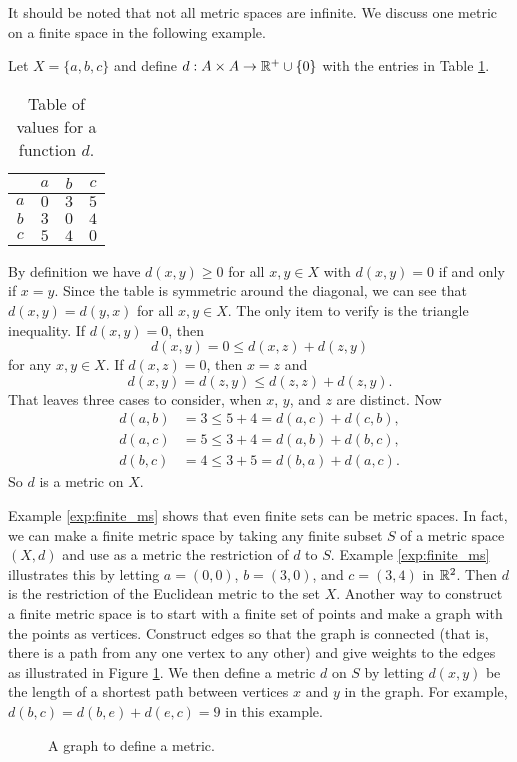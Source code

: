 It should be noted that not all metric spaces are infinite. We discuss one metric on a finite space in the following example.

\begin{example} \label{exp:finite_ms} Let $X = \{a,b,c\}$ and define $d: A \times A \to \mathbb{R}^+ \cup \{0\}$ with the entries in Table \ref{T:finite_metric_ex}.
\begin{table}[ht]
\begin{center}
\begin{tabular}{c|ccc}
	&$a$ 	&$b$		&$c$ \\ \hline
$a$	&$0$		&$3$		&$5$ \\ 
$b$	&$3$		&$0$		&$4$ \\
$c$	&$5$		&$4$		&$0$ 
\end{tabular}
\caption{Table of values for a function $d$.}
\label{T:finite_metric_ex}
\end{center}
\end{table}
By definition we have $d(x,y) \geq 0$ for all $x, y \in X$ with $d(x,y) = 0$ if and only if $x=y$. Since the table is symmetric around the diagonal, we can see that $d(x,y) = d(y,x)$ for all $x,y \in X$. The only item to verify is the triangle inequality. If $d(x,y) = 0$, then
\[d(x,y) = 0 \leq d(x,z) + d(z,y)\]
for any $x,y \in X$. If $d(x,z) = 0$, then $x=z$ and 
\[d(x,y) = d(z,y) \leq d(z,z) + d(z,y).\]
That leaves three cases to consider, when $x$, $y$, and $z$ are distinct. Now 
\begin{align*}
d(a,b) &= 3 \leq 5+4 = d(a,c) + d(c,b), \\
d(a,c) &= 5 \leq 3+4 = d(a,b) + d(b,c), \\
d(b,c) &= 4 \leq 3+5 = d(b,a) + d(a,c).
\end{align*}
So $d$ is a metric on $X$. 
\end{example}

Example \ref{exp:finite_ms} shows that even finite sets can be metric spaces. In fact, we can make a finite metric space by taking any finite subset $S$ of a metric space $(X,d)$ and use as a metric the restriction of $d$ to $S$. Example \ref{exp:finite_ms} illustrates this by letting $a = (0,0)$, $b = (3,0)$, and $c = (3,4)$ in $\mathbb{R}^2$. Then $d$ is the restriction of the Euclidean metric to the set $X$. Another way to construct a finite metric space is to start with a finite set of points and make a graph with the points as vertices. Construct edges so that the graph is connected (that is, there is a path from any one vertex to any other) and give weights to the edges as illustrated in Figure \ref{F:Graph_metric}. We then define a metric $d$ on $S$ by letting $d(x,y)$ be the length of a shortest path between vertices $x$ and $y$ in the graph. For example, $d(b,c) = d(b,e) + d(e,c) = 9$ in this example. 
\begin{figure}[h]
\begin{center}
\caption{A graph to define a metric.} 
\label{F:Graph_metric}
\end{center}
\end{figure}

